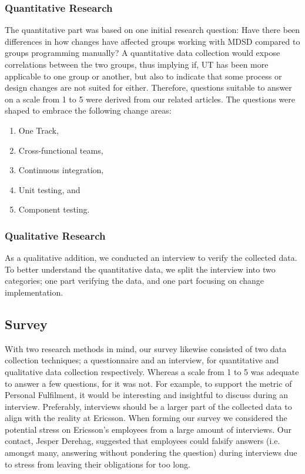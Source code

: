 \documentclass[final_report_innit.tex]{subfiles}
\begin{document}
\subsubsection{Quantitative Research}\label{approachQuant}
The quantitative part was based on one initial research question: Have there been differences in how changes have affected groups working with MDSD compared to groups programming manually? A quantitative data collection would expose correlations between the two groups, thus implying if, UT has been more applicable to one group or another, but also to indicate that some process or design changes are not suited for either. Therefore, questions suitable to answer on a scale from 1 to 5 were derived from our related articles. The questions were shaped to embrace the following change areas:
\\
\begin{enumerate}
	\item One Track,
	\item Cross-functional teams,
	\item Continuous integration,
	\item Unit testing, and
	\item Component testing. \\ %
\end{enumerate}

\subsubsection{Qualitative Research}\label{approachQual}
As a qualitative addition, we conducted an interview to verify the collected data. To better understand the quantitative data, we split the interview into two categories; one part verifying the data, and one part focusing on change implementation.

\subsection{Survey}\label{approachSurvey}
With two research methods in mind, our survey likewise consisted of two data collection techniques; a questionnaire and an interview, for quantitative and qualitative data collection respectively. Whereas a scale from 1 to 5 was adequate to answer a few questions, for it was not. For example, to support the metric of Personal Fulfilment, it would be interesting and insightful to discuss during an interview. Preferably, interviews should be a larger part of the collected data to align with the reality at Ericsson. When forming our survey we considered the potential stress on Ericsson's employees from a large amount of interviews. Our contact, Jesper Derehag, suggested that employees could falsify answers (i.e. amongst many, answering without pondering the question) during interviews due to stress from leaving their obligations for too long. 
\\
\end{document}
